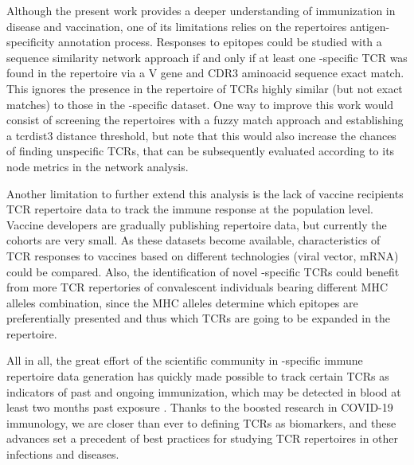 Although the present work provides a deeper understanding of \covid{} immunization in disease and vaccination, one of its limitations relies on the repertoires antigen-specificity annotation process. Responses to \covid{} epitopes could be studied with a sequence similarity network approach if and only if at least one \covid-specific TCR was found in the repertoire via a V gene and CDR3 aminoacid sequence exact match. This ignores the presence in the repertoire of TCRs highly similar (but not exact matches) to those in the \covid-specific dataset. One way to improve this work would consist of screening the repertoires with a fuzzy match approach and establishing a tcrdist3 distance threshold, but note that this would also increase the chances of finding unspecific TCRs, that can be subsequently evaluated according to its node metrics in the network analysis.

Another limitation to further extend this analysis is the lack of vaccine recipients TCR repertoire data to track the immune response at the population level. Vaccine developers are gradually publishing repertoire data, but currently the cohorts are very small. As these datasets become available, characteristics of TCR responses to vaccines based on different technologies (viral vector, mRNA) could be compared. Also, the identification of novel \covid-specific TCRs could benefit from more TCR repertories of convalescent individuals bearing different MHC alleles combination, since the MHC alleles determine which epitopes are preferentially presented and thus which TCRs are going to be expanded in the repertoire.

All in all, the great effort of the scientific community in \covid-specific immune repertoire data generation has quickly made possible to track certain TCRs as indicators of past and ongoing \covid{} immunization, which may be detected in blood at least two months past exposure \citep{snyderdiagnosis}. Thanks to the boosted research in COVID-19 immunology, we are closer than ever to defining TCRs as biomarkers, and these advances set a precedent of best practices for studying TCR repertoires in other infections and diseases.





